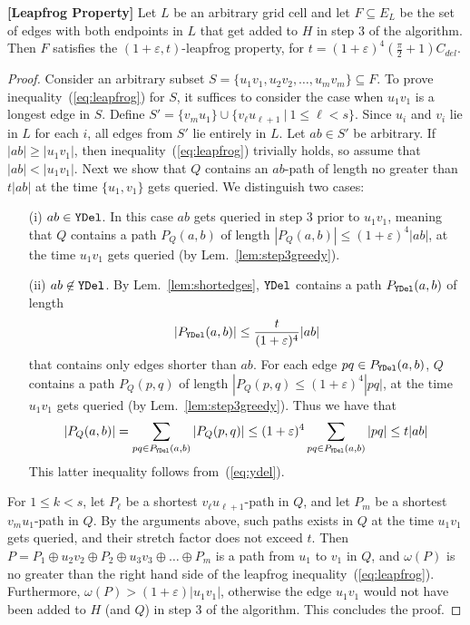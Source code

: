 \documentclass{llncs}
\newcommand{\ABox}{
\raisebox{3pt}{\framebox[6pt]{\rule{6pt}{0pt}}}
}
\newcommand{\e}{\varepsilon}
\newcommand{\ydel}{{\tt YDel}}
\newcommand{\w}{\omega}
\begin{document}
\begin{theorem} {\bf [Leapfrog Property]}
Let $L$ be an arbitrary grid cell and let $F \subseteq E_L$ be the set of edges with both
endpoints in $L$ that get added to $H$ in step 3 of
the algorithm.
Then $F$ satisfies the $(1+\e, t)$-leapfrog property, for $t = (1+\e)^4(\frac{\pi}{2}+1)C_{del}$.
\label{thm:H.leapfrog}
\end{theorem}
\begin{proof}
Consider an arbitrary subset $S = \{u_1 v_1, u_2 v_2, \ldots, u_m v_m\} \subseteq F$. To prove
inequality~(\ref{eq:leapfrog}) for $S$, it suffices to consider the
case when $u_1 v_1$ is a longest edge in $S$.
Define $S' = \{v_mu_1\} \cup\{v_{\ell} u_{\ell+1}~|~ 1 \le \ell < s\}$. Since
$u_i$ and $v_i$ lie in $L$ for each $i$, all edges from $S'$ lie entirely in $L$.
Let $ab \in S'$ be arbitrary. If $|ab| \ge |u_1v_1|$, then
inequality~(\ref{eq:leapfrog}) trivially holds, so assume that $|ab| < |u_1v_1|$.
Next we show that $Q$ contains an $ab$-path of length no greater than $t |ab|$
at the time $\{u_1, v_1\}$ gets queried.
We distinguish two cases:
\begin{itemize}
\item [(i)] $ab \in \ydel$. In this case $ab$ gets queried in step 3 prior to $u_1 v_1$,
meaning that $Q$ contains a path $P_Q(a,b)$ of length $|P_Q(a,b)| \le (1+\e)^4|ab|$, at the
time $u_1 v_1$ gets queried (by Lem.~\ref{lem:step3greedy}).
\item[(ii)] $ab \not\in \ydel$. By Lem.~\ref{lem:shortedges}, $\ydel$ contains a path $P_{\ydel}(a,b)$
of length
\begin{equation}
|P_{\ydel}(a,b)| \le \frac{t}{(1+\e)^4}|ab|
\label{eq:ydel}
\end{equation}
that contains only edges shorter than $ab$. For each edge $pq \in P_{\ydel}(a,b)$, $Q$ contains a path $P_Q(p,q)$ of length $|P_Q(p,q) \le (1+\e)^4|pq|$, at the time $u_1v_1$ gets queried (by Lem.~\ref{lem:step3greedy}). Thus we have that
\begin{equation}
|P_Q(a, b)| = \sum_{pq \in P_{\ydel}(a,b)} |P_Q(p,q)|
\le (1+\e)^4 \sum_{pq \in P_{\ydel}(a,b)} |pq| \le t |ab|
\end{equation}
This latter inequality follows from~(\ref{eq:ydel}).
\end{itemize}
For $1 \le k < s$, let $P_{\ell}$ be a shortest $v_{\ell}u_{\ell+1}$-path in $Q$, and let $P_m$ be a shortest $v_m u_1$-path in $Q$. By the arguments above, such paths exists in $Q$ at the time $u_1 v_1$ gets queried, and their stretch factor does not exceed $t$. Then $P = P_1 \oplus u_2v_2 \oplus P_2 \oplus u_3 v_3 \oplus \ldots \oplus P_m$ is a path from $u_1$ to $v_1$ in $Q$, and $\w(P)$ is no greater than the right hand side of the leapfrog inequality~(\ref{eq:leapfrog}).
Furthermore, $\w(P) > (1+\e) |u_1 v_1|$, otherwise the edge $u_1 v_1$ would not have been added to $H$ (and $Q$) in step 3 of the algorithm. This concludes the proof. \hfill\ABox
\end{proof}
\end{document}
